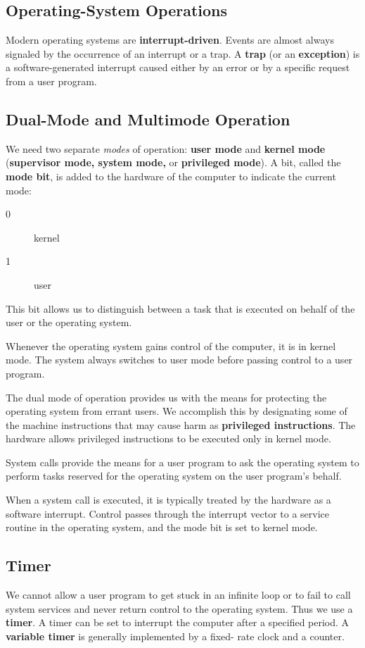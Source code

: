 \documentclass[]{article}
\begin{document}
\subsection*{Operating-System Operations}
Modern operating systems are \textbf{interrupt-driven}. Events are almost always
signaled by the occurrence of an interrupt or a trap. A \textbf{trap} (or an
\textbf{exception}) is a software-generated interrupt caused either by an error
or by a specific request from a user program.

\subsection*{Dual-Mode and Multimode Operation}
We need two separate \emph{modes} of operation: \textbf{user mode} and
\textbf{kernel mode} (\textbf{supervisor mode, system mode,} or
\textbf{privileged mode}). A bit, called the \textbf{mode bit}, is added to the
hardware of the computer to indicate the current mode:
\begin{description}
\item[0] kernel
\item[1] user
\end{description}
This bit allows us to distinguish between a task that is executed on behalf of
the user or the operating system.

Whenever the operating system gains control of the computer, it is in kernel
mode. The system always switches to user mode before passing control to a user
program.

The dual mode of operation provides us with the means for protecting the
operating system from errant users. We accomplish this by designating some of
the machine instructions that may cause harm as \textbf{privileged
instructions}. The hardware allows privileged instructions to be executed only
in kernel mode.

System calls provide the means for a user program to ask the operating system to
perform tasks reserved for the operating system on the user program's behalf.

When a system call is executed, it is typically treated by the hardware as a
software interrupt. Control passes through the interrupt vector to a service
routine in the operating system, and the mode bit is set to kernel mode.

\subsection*{Timer}
We cannot allow a user program to get stuck in an infinite loop or to fail to
call system services and never return control to the operating system.  Thus we
use a \textbf{timer}. A timer can be set to interrupt the computer after a
specified period. A \textbf{variable timer} is generally implemented by a fixed-
rate clock and a counter.
\end{document}
